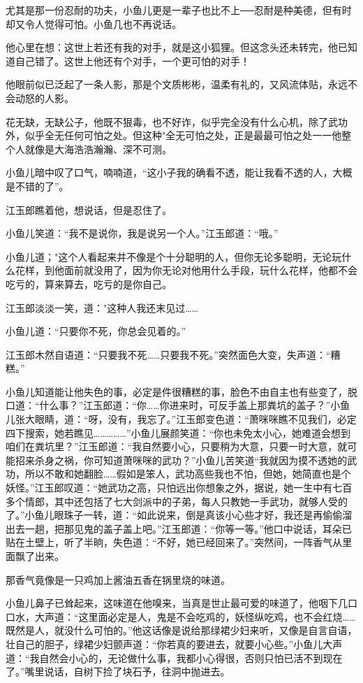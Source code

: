 \documentclass[12pt,oneside]{book}
\begin{document}
尤其是那一份忍耐的功夫，小鱼儿更是一辈子也比不上──忍耐是种美德，但有时却又令人觉得可怕。小鱼几也不再说话。

他心里在想：这世上若还有我的对手，就是这小狐狸。但这念头还未转完，他已知道自己错了。这世上他还有个对手，一个更可怕的对手！

他眼前似已泛起了一条人影，那是个文质彬彬，温柔有礼的，又风流体贴，永远不会动怒的人影。

花无缺，无缺公子，他既不狠毒，也不好诈，似乎完全没有什么心机，除了武功外，似乎全无任何可怕之处。但这种"全无可怕之处，正是最最可怕之处一一他整个人就像是大海浩浩瀚瀚、深不可测。

小鱼儿暗中叹了口气，喃喃道，``这小子我的确看不透，能让我看不透的人，大概是不错的了''。

江玉郎瞧着他，想说话，但是忍住了。

小鱼儿笑道：``我不是说你，我是说另一个人。''江玉郎道：``哦。''

小鱼儿道；"这个人看起来并不像是个十分聪明的人，但你无论多聪明，无论玩什么花样，到他面前就没用了，因为你无论对他用什么手段，玩什么花样，他都不会吃亏的，算来算去，吃亏的是你自己。

江玉郎淡淡一笑，道："这种人我还末见过\ldots\ldots{}

小鱼儿道：``只要你不死，你总会见着的。''

江玉郎木然自语道：``只要我不死\ldots\ldots 只要我不死。''突然面色大变，失声道：``糟糕。''

小鱼儿知道能让他失色的事，必定是件很糟糕的事，脸色不由自主也有些变了，脱口道：``什么事？''江玉郎道：``你\ldots\ldots 你进来时，可反手盖上那粪坑的盖子？''小鱼儿张大眼睛，道：``呀，没有，我忘了。''江玉郎变色道：``萧咪咪瞧不见我们，必定四下搜索，她若瞧见\ldots\ldots\ldots\ldots\ldots{}''小鱼儿展颜笑道：``你也未免太小心，她难道会想到咱们在粪坑里？''江玉郎道：``我自然要小心，只要稍为大意，只要一时大意，就可能招来杀身之祸，你可知道萧咪咪的武功？''小鱼儿苦笑道``我就因为摸不透她的武功，所以不敢和她翻脸\ldots\ldots 假如是笨人，武功高些我也不怕，但她，她简直也是个妖怪。''江玉郎叹道：``她武功之高，只怕远出你想象之外，据说，她一生中有七百多个情郎，其中还包括了七大剑派中的子弟，每人只教她一手武功，就够人受的了。''小鱼儿眼珠子一转，道：``如此说来，倒是真该小心些才好，我还是再偷偷溜出去一趟，把那见鬼的盖子盖上吧。''江玉郎道：``你等一等。''他口中说话，耳朵已贴在土壁上，听了半晌，失色道：``不好，她已经回来了。''突然间，一阵香气从里面飘了出来。

那香气竟像是一只鸡加上酱油五香在锅里烧的味道。

小鱼儿鼻子已耸起来，这味道在他嗅来，当真是世止最可爱的味道了，他咽下几口口水，大声道：``这里面必定是人，鬼是不会吃鸡的，妖怪纵吃鸡，也不会红烧\ldots\ldots 既然是人，就没什么可怕的。''他这话像是说给那绿裙少妇来听，又像是自言自语，壮自己的胆子，绿裙少妇颤声道：``你若真的要进去，就要小心些。''小鱼儿大声道：``我自然会小心的，无论做什么事，我都小心得很，否则只怕已活不到现在了。''嘴里说话，自树下捡了块石予，往洞中抛进去。
\end{document}

